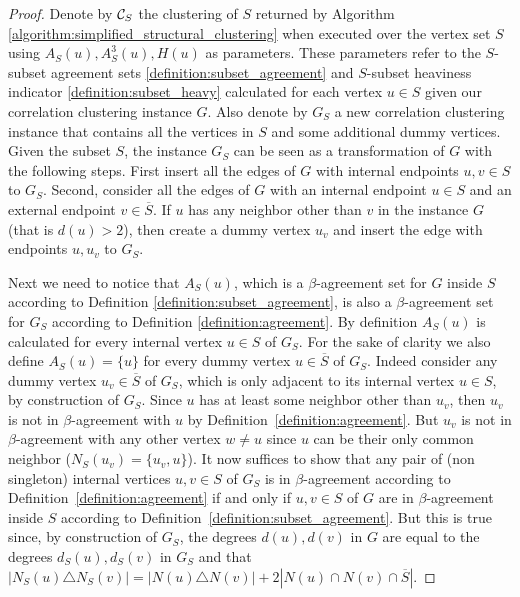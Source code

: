 \documentclass{article}
\begin{document}
\begin{proof}
    Denote by $\mathcal{C}_S$ the clustering of $S$ returned by Algorithm \ref{algorithm:simplified_structural_clustering} when executed over the vertex set $S$ using $A_S(u), A_S^3(u), H(u)$ as parameters. These parameters refer to the $S$-subset agreement sets \ref{definition:subset_agreement} and $S$-subset heaviness indicator \ref{definition:subset_heavy} calculated for each vertex $u\in S$ given our correlation clustering instance $G$.
Also denote by $G_S$ a new correlation clustering instance that contains all the vertices in $S$ and some additional dummy vertices. Given the subset $S$, the instance $G_S$ can be seen as a transformation of $G$ with the following steps. First insert all the edges of $G$ with internal endpoints $u, v\in S$ to $G_S$. Second, consider all the edges of $G$ with an internal endpoint $u\in S$ and an external endpoint $v\in \overline{S}$. If $u$ has any neighbor other than $v$ in the instance $G$ (that is $d(u) > 2$), then create a dummy vertex $u_v$ and insert the edge with endpoints $u, u_v$ to $G_S$.

    Next we need to notice that $A_S(u)$, which is a $\beta$-agreement set for $G$ inside $S$ according to Definition \ref{definition:subset_agreement}, is also a $\beta$-agreement set for $G_S$ according to Definition \ref{definition:agreement}. By definition $A_S(u)$ is calculated for every internal vertex $u\in S$ of $G_S$. For the sake of clarity we also define $A_S(u) = \{u\}$ for every dummy vertex $u\in \overline{S}$ of $G_S$.
Indeed consider any dummy vertex $u_v\in \overline{S}$ of $G_S$, which is only adjacent to its internal vertex $u\in S$, by construction of $G_S$. Since $u$ has at least some neighbor other than $u_v$, then $u_v$ is not in $\beta$-agreement with $u$ by Definition~\ref{definition:agreement}. But $u_v$ is not in $\beta$-agreement with any other vertex $w\neq u$ since $u$ can be their only common neighbor ($N_S(u_v) = \{u_v, u\}$). It now suffices to show that any pair of (non singleton) internal vertices $u, v\in S$ of $G_S$ is in $\beta$-agreement according to Definition~\ref{definition:agreement} if and only if $u, v\in S$ of $G$ are in $\beta$-agreement inside $S$ according to Definition~\ref{definition:subset_agreement}. But this is true since, by construction of $G_S$, the degrees $d(u), d(v)$ in $G$ are equal to the degrees $d_S(u), d_S(v)$ in $G_S$ and that $|N_S(u)\triangle N_S(v)| = |N(u)\triangle N(v)| + 2|N(u)\cap N(v)\cap \overline{S}|$.
    

\end{proof}
\end{document}
